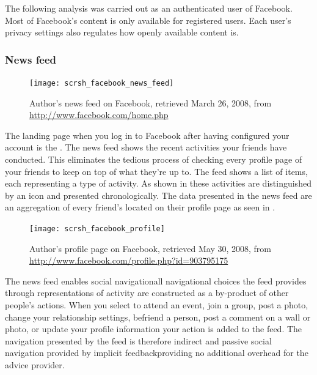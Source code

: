 The following analysis was carried out as an authenticated user of Facebook.
Most of Facebook's content is only available for registered users. Each user's
privacy settings also regulates how openly available content is.

\subsubsection{News feed}
\label{section:analysis.facebook.news.feed}

\begin{figure}
  \texttt{[image: scrsh\_facebook\_news\_feed]}
  \caption[Facebook News Feed]{%
     Author's news feed on Facebook,
     retrieved March 26, 2008, from \url{http://www.facebook.com/home.php}}
  \label{figure:scrsh.facebook.news.feed}
\end{figure}

The landing page when you log in to Facebook after having configured your
account is the  .
The news feed shows the recent activities your
friends have conducted. This eliminates the tedious process of checking every
profile page of your friends to keep on top of what they're up to.
The feed shows a list of items, each representing a type of activity. As
shown in 
these activities are distinguished by an
icon and presented chronologically. The data presented in the news feed are an
aggregation of every friend's  located on their profile page
 as seen in .

\begin{figure}
  \texttt{[image: scrsh\_facebook\_profile]}
  \caption[Facebook Profile]{%
     Author's profile page on Facebook,
     retrieved May 30, 2008, from
     \url{http://www.facebook.com/profile.php?id=903795175}}
  \label{figure:scrsh.facebook.profile}
\end{figure}

The news feed enables social navigation\dash{}all
navigational choices the feed provides
through representations of activity are constructed as a by-product of
other people's actions. When you select to attend an event, join a group,
post a photo, change your relationship settings, befriend a person, post a
comment on a wall or photo, or update your profile information your action
is added to the feed. The navigation presented by the feed
is therefore indirect and passive social navigation provided by implicit
feedback\dash{}providing no additional overhead for the advice provider.

